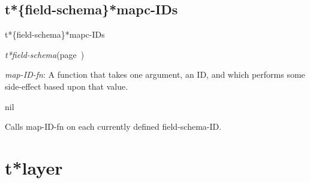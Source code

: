 \subsection{t*\{field-schema\}*mapc-IDs}
\label{t*field-schema*mapc-IDs}

\begin{description}
\item [Name:]  t*\{field-schema\}*mapc-IDs

\item [Class:] {\sl t*field-schema}\hfill(page~\pageref{t*field-schema})

\item [Parameters:]
\item {\sl map-ID-fn}:  A function that takes one argument, an ID,
and which performs some side-effect based upon that
value.



\item [Return-value:] nil

\item [Description:]

Calls map-ID-fn on each currently defined field-schema-ID.

\item [Public:]



\end{description}
\horizontalline

\section{t*layer}
\label{t*layer}

